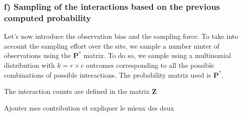 \subsubsection{f) Sampling of the interactions based on the previous computed probability}
Let's now introduce the observation bias and the sampling force. To take into account the sampling effort over the site, we sample a number ninter of observations using the $\textbf{P}^*$ matrix. To do so, we sample using a multinomial distribution with $k = r \times c$ outcomes corresponding to all the possible combinations of possible interactions. The probability matrix used is $\textbf{P}^*$.

The interaction counts are defined in the matrix $\textbf{Z}$




Ajouter mes contribution et expliquer le mieux des deux